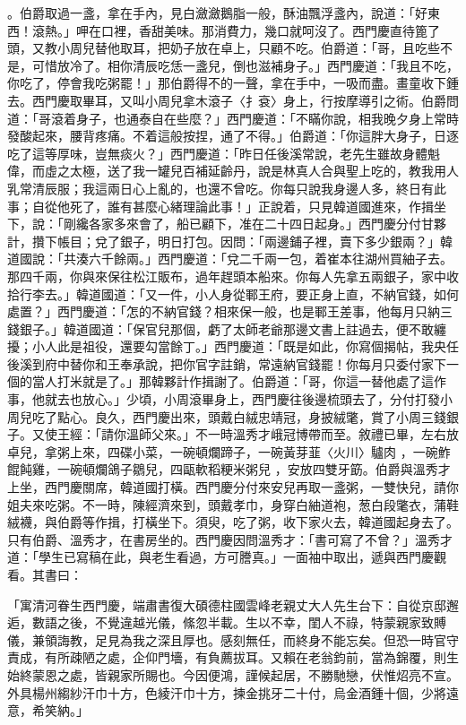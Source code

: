 \begin{showcontents}{}
。伯爵取過一盞，拿在手內，見白瀲瀲鵝脂一般，酥油飄浮盞內，說道：「好東西！滾熱。」呷在口裡，香甜美味。那消費力，幾口就呵沒了。西門慶直待篦了頭，又教小周兒替他取耳，把奶子放在卓上，只顧不吃。伯爵道：「哥，且吃些不是，可惜放冷了。相你清辰吃恁一盞兒，倒也滋補身子。」西門慶道：「我且不吃，你吃了，停會我吃粥罷！」那伯爵得不的一聲，拿在手中，一吸而盡。畫童收下鍾去。西門慶取畢耳，又叫小周兒拿木滾子〈扌袞〉身上，行按摩導引之術。伯爵問道：「哥滾着身子，也通泰自在些麼？」西門慶道：「不瞞你說，相我晚夕身上常時發酸起來，腰背疼痛。不着這般按捏，通了不得。」伯爵道：「你這胖大身子，日逐吃了這等厚味，豈無痰火？」西門慶道：「昨日任後溪常說，老先生雖故身體魁偉，而虛之太極，送了我一罐兒百補延齡丹，說是林真人合與聖上吃的，教我用人乳常清辰服；我這兩日心上亂的，也還不曾吃。你每只說我身邊人多，終日有此事；自從他死了，誰有甚麼心緒理論此事！」正說着，只見韓道國進來，作揖坐下，說：「剛纔各家多來會了，船已顧下，准在二十四日起身。」西門慶分付甘夥計，攢下帳目；兌了銀子，明日打包。因問：「兩邊鋪子裡，賣下多少銀兩？」韓道國說：「共湊六千餘兩。」西門慶道：「兌二千兩一包，着崔本往湖州買紬子去。那四千兩，你與來保往松江販布，過年趕頭本船來。你每人先拿五兩銀子，家中收拾行李去。」韓道國道：「又一件，小人身從鄆王府，要正身上直，不納官錢，如何處置？」西門慶道：「怎的不納官錢？相來保一般，也是鄆王差事，他每月只納三錢銀子。」韓道國道：「保官兒那個，虧了太師老爺那邊文書上註過去，便不敢纏擾；小人此是祖役，還要勾當餘丁。」西門慶道：「既是如此，你寫個揭帖，我央任後溪到府中替你和王奉承說，把你官字註銷，常遠納官錢罷！你每月只委付家下一個的當人打米就是了。」那韓夥計作揖謝了。伯爵道：「哥，你這一替他處了這作事，他就去也放心。」少頃，小周滾畢身上，西門慶往後邊梳頭去了，分付打發小周兒吃了點心。良久，西門慶出來，頭戴白絨忠靖冠，身披絨氅，賞了小周三錢銀子。又使王經：「請你溫師父來。」不一時溫秀才峨冠博帶而至。敘禮已畢，左右放卓兒，拿粥上來，四碟小菜，一碗頓爛蹄子，一碗黃芽韮〈火川〉驢肉 ，一碗鮓餛飩雞，一碗頓爛鴿子鶵兒，四甌軟稻粳米粥兒 ，安放四雙牙筯。伯爵與溫秀才上坐，西門慶關席，韓道國打橫。西門慶分付來安兒再取一盞粥，一雙快兒，請你姐夫來吃粥。不一時，陳經濟來到，頭戴孝巾，身穿白紬道袍，葱白段氅衣，蒲鞋絨襪，與伯爵等作揖，打橫坐下。須臾，吃了粥，收下家火去，韓道國起身去了。只有伯爵、溫秀才，在書房坐的。西門慶因問溫秀才：「書可寫了不曾？」溫秀才道：「學生已寫稿在此，與老生看過，方可謄真。」一面袖中取出，遞與西門慶觀看。其書曰：

「寓清河眷生西門慶，端肅書復大碩德柱國雲峰老親丈大人先生台下：自從京邸邂逅，數語之後，不覺違越光儀，絛忽半載。生以不幸，閨人不祿，特蒙親家致賻儀，兼領誨教，足見為我之深且厚也。感刻無任，而終身不能忘矣。但恐一時官守責成，有所疎陋之處，企仰門墻，有負薦拔耳。又賴在老翁鈞前，當為錦覆，則生始終蒙恩之處，皆親家所賜也。今因便鴻，謹候起居，不勝馳戀，伏惟炤亮不宣。外具楊州縐紗汗巾十方，色綾汗巾十方，揀金挑牙二十付，烏金酒鍾十個，少將遠意，希笑納。」


\end{showcontents}
